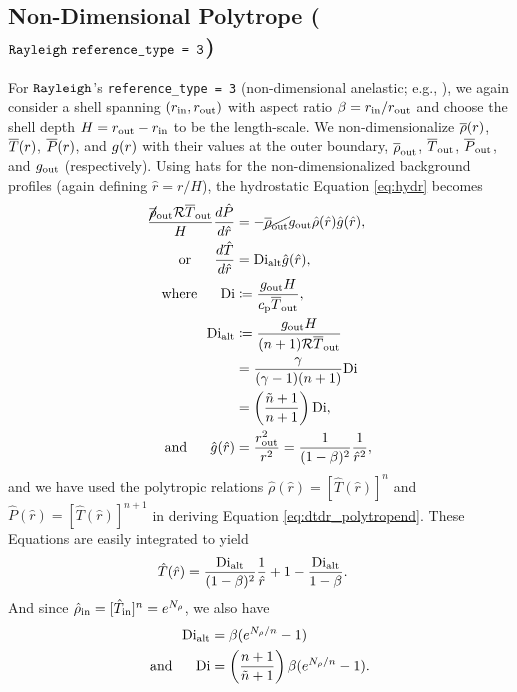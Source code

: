 \documentclass[12pt]{article}
\numberwithin{equation}{section}
\newcommand{\dialt}{\di_{\rm{alt}}}
\newcommand{\nrho}{N_\rho}
\begin{document}
\subsection{Non-Dimensional Polytrope ($\texttt{Rayleigh}\ \texttt{reference\_type = 3}$)} 
For $\texttt{Rayleigh}$'s \texttt{reference\_type = 3} (non-dimensional anelastic; e.g., \citealt{Heimpel2022}), we again consider a shell spanning $(r_{\rm{in}}, r_{\rm{out}})$ with aspect ratio $\beta=r_{\rm{in}}/r_{\rm{out}}$ and choose the shell depth $H=r_{\rm{out}}-r_{\rm{in}}$ to be the length-scale. We non-dimensionalize $\overline{\rho}(r)$, $\overline{T}(r)$, $\overline{P}(r)$, and $g(r)$ with their values at the outer boundary, $\overline{\rho}_{\rm{out}}$, $\overline{T}_{\rm{out}}$, $\overline{P}_{\rm{out}}$, and $g_{\rm{out}}$ (respectively). Using hats for the non-dimensionalized background profiles (again defining $\hat{r}=r/H$), the hydrostatic Equation \eqref{eq:hydr} becomes
\begin{subequations}
\begin{align}
	\frac{\cancel{\rhoref}\out\gasconst\tmpref\out}{H}\frac{d\hat{P}}{d\hat{r}} &= -\cancel{\rhoref\out}g\out\hat{\rho}(\hat{r})\hat{g}(\hat{r}),
	\\
	\orr \frac{d\hat{T}}{d\hat{r}} &= \dialt\hat{g}(\hat{r})\label{eq:dtdr_polytropend},
	\\
	\where \di &\define \frac{g\out H}{\cp\tmpref\out},
	\\
	\dialt &\define \frac{g\out H}{(n+1)\gasconst \tmpref\out} \nonumber\\
	&= \frac{\gamma}{(\gamma-1)(n+1)}\di \nonumber\\
	&= \left( \frac{\tilde{n}+1}{n+1} \right) \di,
	\\
	\andd \hat{g}(\hat{r}) &= \frac{r\out^2}{r^2} = \frac{1}{(1-\beta)^2}\frac{1}{\hat{r}^2},
\end{align}
\end{subequations}
and we have used the polytropic relations $\hat{\rho}(\hat{r})=[\hat{T}(\hat{r})]^n$ and $\hat{P}(\hat{r})=[\hat{T}(\hat{r})]^{n+1}$ in deriving Equation \eqref{eq:dtdr_polytropend}. These Equations are easily integrated to yield
\begin{align}
	\hat{T}(\hat{r}) &= \frac{\dialt}{(1-\beta)^2}\frac{1}{\hat{r}} + 1 - \frac{\dialt}{1-\beta}.
\end{align}
And since $\hat{\rho}\inn = [\hat{T}\inn]^n = e^{\nrho}$, we also have 
\begin{subequations}
\begin{align}
	\dialt &= \beta (e^{\nrho/n} - 1)\\
	\andd \di &= \left( \frac{n+1}{\tilde{n}+1} \right)\beta (e^{\nrho/n} - 1).
\end{align}
\end{subequations}
\end{document}
